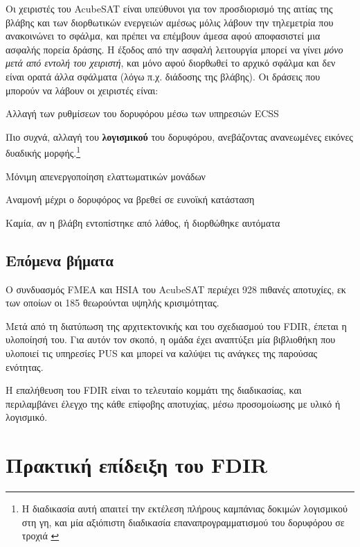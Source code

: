 \documentclass[a4paper,nobib]{tufte-book}
\begin{document}
Οι χειριστές του AcubeSAT είναι υπεύθυνοι για τον προσδιορισμό της αιτίας της βλάβης και των διορθωτικών ενεργειών αμέσως μόλις λάβουν την τηλεμετρία που ανακοινώνει το σφάλμα, και πρέπει να επέμβουν άμεσα αφού αποφασιστεί μια ασφαλής πορεία δράσης. Η έξοδος από την ασφαλή λειτουργία μπορεί να γίνει \emph{μόνο μετά από εντολή του χειριστή}, και μόνο αφού διορθωθεί το αρχικό σφάλμα και δεν είναι ορατά άλλα σφάλματα (λόγω π.χ. διάδοσης της βλάβης). Οι δράσεις που μπορούν να λάβουν οι χειριστές είναι:
\begin{compactitem}
	\item Αλλαγή των ρυθμίσεων του δορυφόρου μέσω των υπηρεσιών \acs{ECSS}
	\item Πιο συχνά, αλλαγή του \textbf{λογισμικού} του δορυφόρου, ανεβάζοντας ανανεωμένες εικόνες δυαδικής μορφής.\footnote{Η διαδικασία αυτή απαιτεί την εκτέλεση πλήρους καμπάνιας δοκιμών λογισμικού στη γη, και μία αξιόπιστη διαδικασία επαναπρογραμματισμού του δορυφόρου σε τροχιά \parencite[45]{DDJF_OBSW}}
	\item Μόνιμη απενεργοποίηση ελαττωματικών μονάδων
	\item Αναμονή μέχρι ο δορυφόρος να βρεθεί σε ευνοϊκή κατάσταση
	\item Καμία, αν η βλάβη εντοπίστηκε από λάθος, ή διορθώθηκε αυτόματα
\end{compactitem}

\section{Επόμενα βήματα}
Ο συνδυασμός \acs{FMEA} και \acs{HSIA} του AcubeSAT περιέχει 928 πιθανές αποτυχίες, εκ των οποίων οι 185 θεωρούνται υψηλής κρισιμότητας. \parencite{retselis_acubesat_fmea_2020}

Μετά από τη διατύπωση της αρχιτεκτονικής και του σχεδιασμού του \acs{FDIR}, έπεται η υλοποίησή του. Για αυτόν τον σκοπό, η ομάδα έχει αναπτύξει μία βιβλιοθήκη που υλοποιεί τις υπηρεσίες \acs{PUS} και μπορεί να καλύψει τις ανάγκες της παρούσας ενότητας.

Η επαλήθευση του \acs{FDIR} είναι το τελευταίο κομμάτι της διαδικασίας, και περιλαμβάνει έλεγχο της κάθε επίφοβης αποτυχίας, μέσω προσομοίωσης με υλικό ή λογισμικό.

\chapter{Πρακτική επίδειξη του \ac{FDIR}}
\label{cap:practical}
\end{document}
